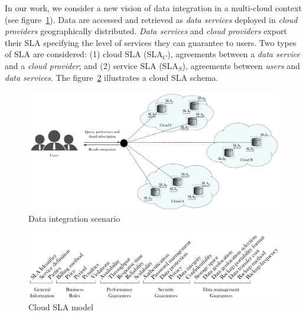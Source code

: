 

In our work, we consider a new vision of data integration in a multi-cloud context (see figure~\ref{fig:scenario}). Data are accessed and retrieved as \textit{data services} deployed in \textit{cloud providers} geographically distributed. \textit{Data services} and \textit{cloud providers} export their SLA specifying the level of services they can guarantee to users. Two types of SLA are considered: (1) cloud SLA (SLA$_{C}$), agreements between a \textit{data service} and a \textit{cloud provider}; and (2) service SLA (SLA$_{S}$), agreements between \textit{users} and \textit{data services}. The figure~\ref{fig:cloudsla} illustrates a cloud SLA schema.  

\begin{figure}[th!]
\center
\includegraphics[scale=0.40]{scenario.pdf}
\caption{Data integration scenario}\label{fig:scenario}
\end{figure}

\begin{figure}[th!]
\center
\includegraphics[scale=0.57]{Cloud_SLA.pdf}
\caption{Cloud SLA model}\label{fig:cloudsla}
\end{figure}

